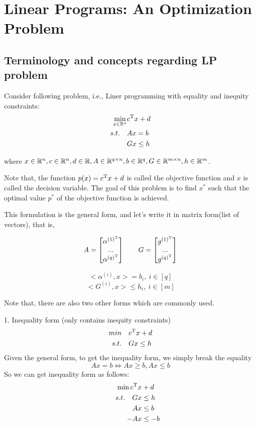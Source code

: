 
\section{Linear Programs: An Optimization Problem}
\subsection{Terminology and concepts regarding LP problem}
Consider following problem, i.e., Liner programming with equality and inequity constraints:
\begin{align*}
	\min_{x\in \mathbb{R}^n}& c^{{\rm T}}x + d\\
	s.t. \quad &Ax = b\\
	&Gx \leq h
\end{align*}

where $x\in \mathbb{R}^n, c\in \mathbb{R}^n, d\in \mathbb{R}, A\in \mathbb{R}^{q\times n}, b\in \mathbb{R}^q, G\in \mathbb{R}^{m\times n}, h\in \mathbb{R}^m$.

Note that, the function $p(x)=c^{{\rm T}}x + d$ is called the objective function and $x$ is called the decision variable. The goal of this problem is to find $x^*$ such that the optimal value $p^*$ of the objective function is achieved.

This formulation is the general form, and let's write it in matrix form(list of vectors), that is,

$$
A = 
\begin{bmatrix}
\alpha^{(1)^{{\rm T}}}\\
...\\
\alpha^{(q)^{{\rm T}}}
\end{bmatrix}
\qquad	
G = 
\begin{bmatrix}
g^{(1)^{{\rm T}}}\\
...\\
g^{(q)^{{\rm T}}}
\end{bmatrix}
$$

$$<\alpha^{(i)}, x> =b_i,\ i\in \left[q\right]$$
$$<G^{(i)}, x>\leq h_i,\ i\in \left[m\right]$$

Note that, there are also two other forms which are commonly used.

1. Inequality form (only contains inequity constraints)
\begin{align*}
	min \quad &c^{{\rm T}}x+d\\
	s.t. \quad &Gx\leq h\\
\end{align*}
Given the general form, to get the inequality form, we simply break the equality
\begin{equation*}
	Ax = b \Leftrightarrow Ax\geq b, Ax\leq b
\end{equation*}
So we can get inequality form as follows:
\begin{align*}
	\min c^{{\rm T}}x&+d\\
	\qquad s.t. \quad Gx &\leq h\\
	Ax &\leq b\\
	-Ax &\leq -b
\end{align*}

